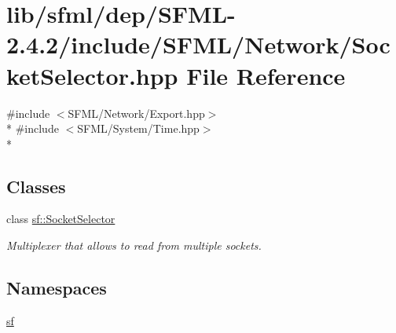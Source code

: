 \hypertarget{sfml_2dep_2_s_f_m_l-2_84_82_2include_2_s_f_m_l_2_network_2_socket_selector_8hpp}{\section{lib/sfml/dep/\-S\-F\-M\-L-\/2.4.2/include/\-S\-F\-M\-L/\-Network/\-Socket\-Selector.hpp File Reference}
\label{sfml_2dep_2_s_f_m_l-2_84_82_2include_2_s_f_m_l_2_network_2_socket_selector_8hpp}
}
{\ttfamily \#include $<$S\-F\-M\-L/\-Network/\-Export.\-hpp$>$}\\*
{\ttfamily \#include $<$S\-F\-M\-L/\-System/\-Time.\-hpp$>$}\\*
\subsection*{Classes}
\begin{DoxyCompactItemize}
\item 
class \hyperlink{classsf_1_1_socket_selector}{sf\-::\-Socket\-Selector}
\begin{DoxyCompactList}\small\item\em Multiplexer that allows to read from multiple sockets. \end{DoxyCompactList}\end{DoxyCompactItemize}
\subsection*{Namespaces}
\begin{DoxyCompactItemize}
\item 
\hyperlink{namespacesf}{sf}
\end{DoxyCompactItemize}
